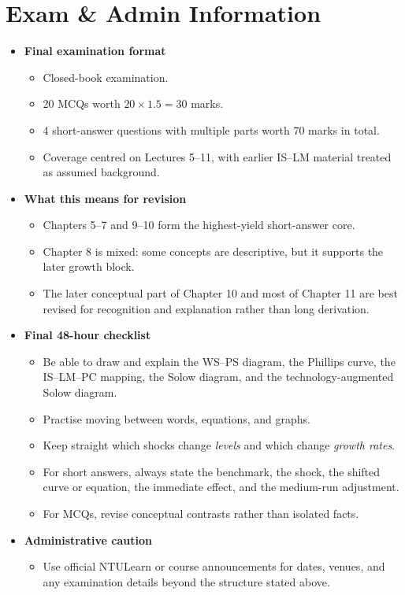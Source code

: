 \documentclass[12pt]{article}
\begin{document}
\section{Exam \& Admin Information}

\begin{itemize}[leftmargin=1.5em]
\item \textbf{Final examination format}
\begin{itemize}[leftmargin=1.5em]
\item Closed-book examination.
\item 20 MCQs worth \(20\times 1.5=30\) marks.
\item 4 short-answer questions with multiple parts worth 70 marks in total.
\item Coverage centred on Lectures 5--11, with earlier IS--LM material treated as assumed background.
\end{itemize}

\item \textbf{What this means for revision}
\begin{itemize}[leftmargin=1.5em]
\item Chapters 5--7 and 9--10 form the highest-yield short-answer core.
\item Chapter 8 is mixed: some concepts are descriptive, but it supports the later growth block.
\item The later conceptual part of Chapter 10 and most of Chapter 11 are best revised for recognition and explanation rather than long derivation.
\end{itemize}

\item \textbf{Final 48-hour checklist}
\begin{itemize}[leftmargin=1.5em]
\item Be able to draw and explain the WS--PS diagram, the Phillips curve, the IS--LM--PC mapping, the Solow diagram, and the technology-augmented Solow diagram.
\item Practise moving between words, equations, and graphs.
\item Keep straight which shocks change \emph{levels} and which change \emph{growth rates}.
\item For short answers, always state the benchmark, the shock, the shifted curve or equation, the immediate effect, and the medium-run adjustment.
\item For MCQs, revise conceptual contrasts rather than isolated facts.
\end{itemize}

\item \textbf{Administrative caution}
\begin{itemize}[leftmargin=1.5em]
\item Use official NTULearn or course announcements for dates, venues, and any examination details beyond the structure stated above.
\end{itemize}
\end{itemize}
\end{document}
